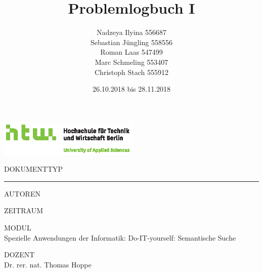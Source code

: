 \documentclass[chapterprefix=false, 12pt, a4paper, oneside, parskip=half, listof=totoc, bibliography=totoc, numbers=noendperiod]{scrbook}
\title{Problemlogbuch I}
\author{Nadzeya Ilyina 556687\\
Sebastian Jüngling 558556\\
Roman Laas 547499\\
Marc Schmeling 553407\\
Christoph Stach 555912}
\date{26.10.2018 bis 28.11.2018}
\begin{document}
    \begin{titlepage}
        \includegraphics[width=0.50\textwidth]{img/Q01_HTW_Berlin_Logo_quer_pos_FARBIG_CMYK.eps}

        \vspace{4.0cm}

        \begin{changemargin}{0.5cm}{0.0cm}
            \color{htwgrau}
            \normalsize
            \textsf{\noindent\MakeUppercase{Dokumenttyp}} \vspace{-20pt}\\

            \noindent\rule{\textwidth}{0.5pt}\vspace{-4pt}
            
            \color{black}
            \huge
            \textsf{\thetitle}
            \vspace{12pt}

            \color{htwgrau}
            \normalsize
            \textsf{\MakeUppercase{Autoren}}\\
            \color{black}
            \large
            \textsf{\theauthor}

            \vfill

            \color{htwgrau}
            \normalsize
            \textsf{\MakeUppercase{Zeitraum}}\\
            \color{black}
            \large
            \textsf{\thedate}

            \color{htwgrau}
            \normalsize
            \textsf{\MakeUppercase{Modul}}\\
            \color{black}
            \large
            \textsf{Spezielle Anwendungen der Informatik: Do-IT-yourself: Semantische Suche}

            \color{htwgrau}
            \normalsize
            \textsf{\MakeUppercase{Dozent}}\\
            \color{black}
            \large
            \textsf{Dr. rer. nat. Thomas Hoppe}



        \end{changemargin}
    \end{titlepage}
\end{document}
